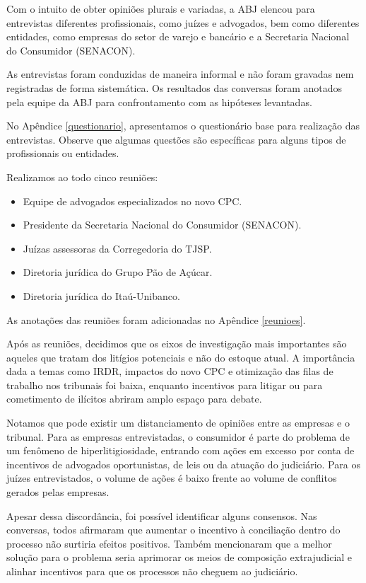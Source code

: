 \documentclass[]{report}
\providecommand{\tightlist}{%
  \setlength{\itemsep}{0pt}\setlength{\parskip}{0pt}}
\begin{document}
Com o intuito de obter opiniões plurais e variadas, a ABJ elencou para
entrevistas diferentes profissionais, como juízes e advogados, bem como
diferentes entidades, como empresas do setor de varejo e bancário e a
Secretaria Nacional do Consumidor (SENACON).

As entrevistas foram conduzidas de maneira informal e não foram gravadas
nem registradas de forma sistemática. Os resultados das conversas foram
anotados pela equipe da ABJ para confrontamento com as hipóteses
levantadas.

No Apêndice \ref{questionario}, apresentamos o questionário base para
realização das entrevistas. Observe que algumas questões são específicas
para alguns tipos de profissionais ou entidades.

Realizamos ao todo cinco reuniões:

\begin{itemize}
\tightlist
\item
  Equipe de advogados especializados no novo CPC.
\item
  Presidente da Secretaria Nacional do Consumidor (SENACON).
\item
  Juízas assessoras da Corregedoria do TJSP.
\item
  Diretoria jurídica do Grupo Pão de Açúcar.
\item
  Diretoria jurídica do Itaú-Unibanco.
\end{itemize}

As anotações das reuniões foram adicionadas no Apêndice \ref{reunioes}.

Após as reuniões, decidimos que os eixos de investigação mais
importantes são aqueles que tratam dos litígios potenciais e não do
estoque atual. A importância dada a temas como IRDR, impactos do novo
CPC e otimização das filas de trabalho nos tribunais foi baixa, enquanto
incentivos para litigar ou para cometimento de ilícitos abriram amplo
espaço para debate.

Notamos que pode existir um distanciamento de opiniões entre as empresas
e o tribunal. Para as empresas entrevistadas, o consumidor é parte do
problema de um fenômeno de hiperlitigiosidade, entrando com ações em
excesso por conta de incentivos de advogados oportunistas, de leis ou da
atuação do judiciário. Para os juízes entrevistados, o volume de ações é
baixo frente ao volume de conflitos gerados pelas empresas.

Apesar dessa discordância, foi possível identificar alguns consensos.
Nas conversas, todos afirmaram que aumentar o incentivo à conciliação
dentro do processo não surtiria efeitos positivos. Também mencionaram
que a melhor solução para o problema seria aprimorar os meios de
composição extrajudicial e alinhar incentivos para que os processos não
cheguem ao judiciário.
\end{document}
